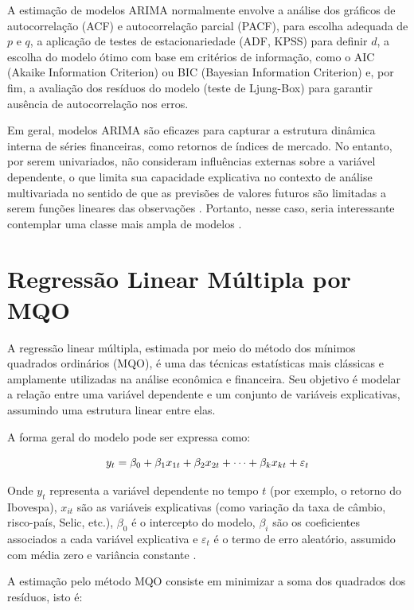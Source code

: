 \documentclass[	12pt, Times, openright, oneside, a4paper, english, brazil]{abntex2}
\begin{document}
A estimação de modelos ARIMA normalmente envolve a análise dos gráficos de autocorrelação (ACF) e autocorrelação parcial (PACF), para escolha adequada de $p$ e $q$, a aplicação de testes de estacionariedade (ADF, KPSS) para definir $d$, a escolha do modelo ótimo com base em critérios de informação, como o AIC (Akaike Information Criterion) ou BIC (Bayesian Information Criterion) e, por fim, a avaliação dos resíduos do modelo (teste de Ljung-Box) para garantir ausência de autocorrelação nos erros.

Em geral, modelos ARIMA são eficazes para capturar a estrutura dinâmica interna de séries financeiras, como retornos de índices de mercado. No entanto, por serem univariados, não consideram influências externas sobre a variável dependente, o que limita sua capacidade explicativa no contexto de análise multivariada no sentido de que as previsões de valores futuros são limitadas a serem funções lineares das observações \cite{Newbold1983}. Portanto, nesse caso, seria interessante contemplar uma classe mais ampla de modelos .

\section{Regressão Linear Múltipla por MQO}

A regressão linear múltipla, estimada por meio do método dos mínimos quadrados ordinários (MQO), é uma das técnicas estatísticas mais clássicas e amplamente utilizadas na análise econômica e financeira. Seu objetivo é modelar a relação entre uma variável dependente e um conjunto de variáveis explicativas, assumindo uma estrutura linear entre elas.

A forma geral do modelo pode ser expressa como:

\begin{equation}\hfill
y_t = \beta_0 + \beta_1 x_{1t} + \beta_2 x_{2t} + \cdots + \beta_k x_{kt} + \varepsilon_t
\label{eq:MQO}
\end{equation}

Onde $y_t$ representa a variável dependente no tempo $t$ (por exemplo, o retorno do Ibovespa), $x_{it}$ são as variáveis explicativas (como variação da taxa de câmbio, risco-país, Selic, etc.), $\beta_0$ é o intercepto do modelo, $\beta_i$ são os coeficientes associados a cada variável explicativa e $\varepsilon_t$ é o termo de erro aleatório, assumido com média zero e variância constante \cite{Coelho2014Regressao}.

A estimação pelo método MQO consiste em minimizar a soma dos quadrados dos resíduos, isto é:
\end{document}
